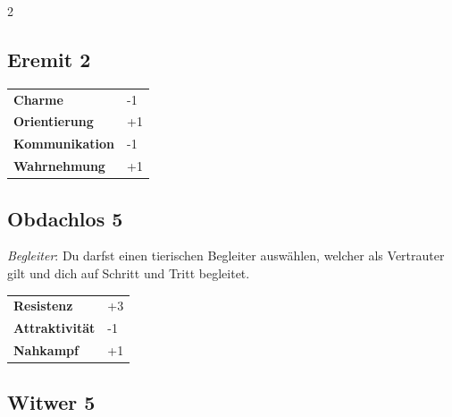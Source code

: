 \begin{multicols}{2}
\begin{tcolorbox}
\end{tcolorbox}

\begin{tcolorbox}
    \subsection*{Eremit \hfill \small{2 }}
    \tcblower




\begin{tabular}{@{}ll@{}}
    \textbf{Charme} & -1\\
    \textbf{Orientierung} & +1\\
    \textbf{Kommunikation} & -1\\
    \textbf{Wahrnehmung} & +1\\
\end{tabular}


\end{tcolorbox}

\begin{tcolorbox}
    \subsection*{Obdachlos \hfill \small{5 }}
    \tcblower
\textit{Begleiter}: Du darfst einen tierischen Begleiter auswählen, welcher als Vertrauter gilt und dich auf Schritt und Tritt begleitet.


\vspace{3mm}

\begin{tabular}{@{}ll@{}}
    \textbf{Resistenz} & +3\\
    \textbf{Attraktivität} & -1\\
    \textbf{Nahkampf} & +1\\
\end{tabular}


\end{tcolorbox}

\begin{tcolorbox}
    \subsection*{Witwer \hfill \small{5 }}
    \tcblower





\end{tcolorbox}
\end{multicols}
